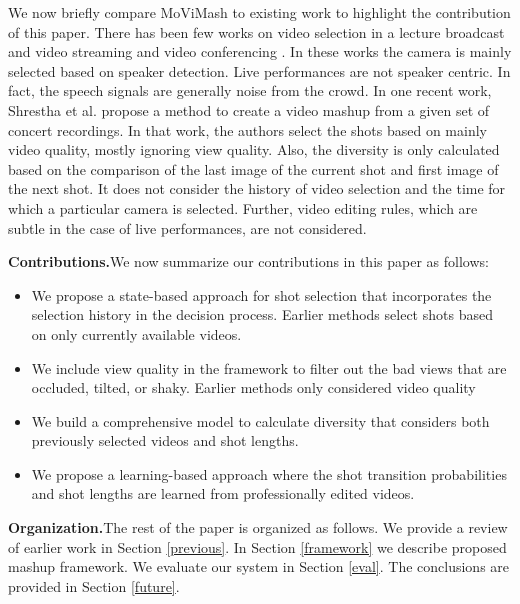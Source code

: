 \documentclass{sig-alternate}
\begin{document}
We now briefly compare MoViMash to existing work to highlight
the contribution of this paper. There has been few works on
video selection in a lecture broadcast and video streaming \cite{21}\cite{6} and video conferencing \cite{3}. In these works the camera is mainly selected based on speaker detection. Live performances are not speaker centric. In fact, the speech signals are generally noise from the crowd. In one recent work, Shrestha et al. \cite{15} propose a method to create a video mashup from a given set of concert recordings. In that work, the authors select the shots based on mainly video quality, mostly ignoring view quality. Also, the diversity is only calculated based on the comparison of the last image of the current shot and first image of the next shot. It does not consider the history of video selection and the time for which a particular camera is selected. Further, video editing rules, which are subtle in the case of live performances, are not considered.

\textbf{Contributions.}We now summarize our contributions in this paper
as follows:
 \begin{itemize} 
    \item We propose a state-based approach for shot selection that incorporates the selection history in the decision process. Earlier
methods select shots based on only currently available videos.
    \item We include view quality in the framework to filter out the bad views that are occluded, tilted, or shaky. Earlier methods only considered video quality 
    \item We build a comprehensive model to calculate diversity that considers both previously selected videos and shot lengths.
    \item We propose a learning-based approach where the shot transition probabilities and shot lengths are learned from professionally edited videos.
 \end{itemize} 

\textbf{Organization.}The rest of the paper is organized as follows.
We provide a review of earlier work in Section \ref{previous}. In Section \ref{framework} we describe proposed mashup framework. We evaluate our system in Section \ref{eval}. The conclusions are provided in Section \ref{future}.
\end{document}
